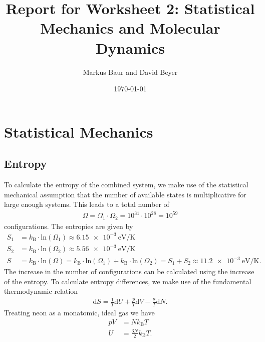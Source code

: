 \documentclass[a4paper,10pt,bibtotoc]{scrartcl}
\begin{document}
\titlehead{Simulation Methods in Physics I \hfill WS 2019/2010}
\title{Report for Worksheet 2: Statistical Mechanics and Molecular Dynamics}
\author{Markus Baur and David Beyer}
\date{\today}
\maketitle

\tableofcontents

\section{Statistical Mechanics}
\subsection{Entropy}
To calculate the entropy of the combined system, we make use of the statistical mechanical assumption that the number of available states is multiplicative for large enough systems. 
This leads to a total number of
\begin{align}
 \Omega = \Omega_1\cdot\Omega_2 = 10^{31}\cdot 10^{28}= 10^{59}
\end{align}
configurations. 
The entropies are given by
\begin{align*}
S_1 &= k_\mathrm{B}\cdot \mathrm{ln}\left(\Omega_1\right) \approx \SI[per-mode=reciprocal]{6.15e-3}{\electronvolt\per\kelvin}\\
S_2 &= k_\mathrm{B}\cdot \mathrm{ln}\left(\Omega_2\right) \approx \SI[per-mode=reciprocal]{5.56e-3}{\electronvolt\per\kelvin}\\
S &= k_\mathrm{B}\cdot \mathrm{ln}\left(\Omega\right) = k_\mathrm{B}\cdot \mathrm{ln}\left(\Omega_1\right) + k_\mathrm{B}\cdot \mathrm{ln}\left(\Omega_2\right) = S_1 + S_2\approx \SI[per-mode=reciprocal]{11.2e-3}{\electronvolt\per\kelvin}.
\end{align*}
The increase in the number of configurations can be calculated using the increase of the entropy.
To calculate entropy differences, we make use of the fundamental thermodynamic relation
\begin{align}
\mathrm{d}S = \frac{1}{T}\mathrm{d}U + \frac{p}{T}\mathrm{d}V - \frac{\mu}{T}\mathrm{d}N.
\end{align}
Treating neon as a monatomic, ideal gas we have
\begin{align}
 pV &= Nk_\mathrm{B}T\\
 U &= \frac{3N}{2}k_\mathrm{B} T.
\end{align}
\end{document}
